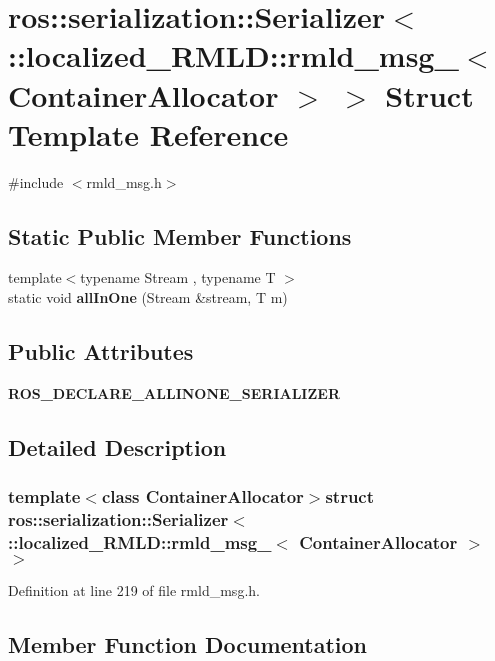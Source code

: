 \section{ros::serialization::Serializer$<$ ::localized\_\-RMLD::rmld\_\-msg\_\-$<$ ContainerAllocator $>$ $>$ Struct Template Reference}
\label{structros_1_1serialization_1_1Serializer_3_01_1_1localized__RMLD_1_1rmld__msg___3_01ContainerAllocator_01_4_01_4}


{\ttfamily \#include $<$rmld\_\-msg.h$>$}

\subsection*{Static Public Member Functions}
\begin{DoxyCompactItemize}
\item 
{\footnotesize template$<$typename Stream , typename T $>$ }\\static void {\bf allInOne} (Stream \&stream, T m)
\end{DoxyCompactItemize}
\subsection*{Public Attributes}
\begin{DoxyCompactItemize}
\item 
{\bf ROS\_\-DECLARE\_\-ALLINONE\_\-SERIALIZER}
\end{DoxyCompactItemize}


\subsection{Detailed Description}
\subsubsection*{template$<$class ContainerAllocator$>$struct ros::serialization::Serializer$<$ ::localized\_\-RMLD::rmld\_\-msg\_\-$<$ ContainerAllocator $>$ $>$}



Definition at line 219 of file rmld\_\-msg.h.



\subsection{Member Function Documentation}
